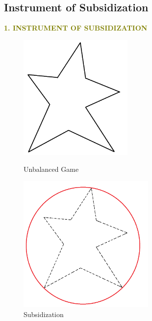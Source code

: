\documentclass[14pt]{beamer}
\begin{document}
\subsection{Instrument of Subsidization}
\begin{frame}
\centering
\normalsize
\textcolor{olive}{\bf {\LARGE 1.} \bf {\LARGE I}NSTRUMENT OF {\bf {\LARGE S}}UBSIDIZATION}
\vspace{5mm}
\begin{figure}[H]
\centering
\begin{minipage}[t]{0.32\textwidth}
\centering
\includegraphics[width=0.5\textwidth]{conculsion1.png}
\caption*{Unbalanced Game}
\end{minipage}
\begin{minipage}[t]{0.32\textwidth}
\centering
\includegraphics[width=0.6\textwidth]{conculsion3.png}
\caption*{Subsidization}
\end{minipage}
\end{figure}
\vspace{-15mm}
\end{frame}
\end{document}
